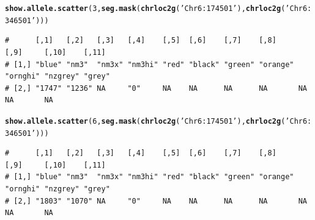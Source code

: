 \documentclass{article}\usepackage[]{graphicx}\usepackage[]{color}
\makeatletter
\newcommand{\hlnum}[1]{\textcolor[rgb]{0.686,0.059,0.569}{#1}}%
\newcommand{\hlstr}[1]{\textcolor[rgb]{0.192,0.494,0.8}{#1}}%
\newcommand{\hlstd}[1]{\textcolor[rgb]{0.345,0.345,0.345}{#1}}%
\newcommand{\hlkwd}[1]{\textcolor[rgb]{0.737,0.353,0.396}{\textbf{#1}}}%
\newenvironment{kframe}{%
 \def\at@end@of@kframe{}%
 \ifinner\ifhmode%
  \def\at@end@of@kframe{\end{minipage}}%
  \begin{minipage}{\columnwidth}%
 \fi\fi%
 \def\FrameCommand##1{\hskip\@totalleftmargin \hskip-\fboxsep
 \colorbox{shadecolor}{##1}\hskip-\fboxsep
     \hskip-\linewidth \hskip-\@totalleftmargin \hskip\columnwidth}%
 \MakeFramed {\advance\hsize-\width
   \@totalleftmargin\z@ \linewidth\hsize
   \@setminipage}}%
 {\par\unskip\endMakeFramed%
 \at@end@of@kframe}
\newenvironment{knitrout}{}{} %
\makeatother
\begin{document}
\begin{knitrout}\footnotesize
{}\color{fgcolor}\begin{kframe}
\begin{alltt}
\hlkwd{show.allele.scatter}\hlstd{(}\hlnum{3}\hlstd{,}\hlkwd{seg.mask}\hlstd{(}\hlkwd{chrloc2g}\hlstd{(}\hlstr{'Chr6:174501'}\hlstd{),}\hlkwd{chrloc2g}\hlstd{(}\hlstr{'Chr6:346501'}\hlstd{)))}
\end{alltt}
\begin{verbatim}
#      [,1]   [,2]   [,3]   [,4]    [,5]  [,6]    [,7]    [,8]     [,9]     [,10]    [,11] 
# [1,] "blue" "nm3"  "nm3x" "nm3hi" "red" "black" "green" "orange" "ornghi" "nzgrey" "grey"
# [2,] "1747" "1236" NA     "0"     NA    NA      NA      NA       NA       NA       NA
\end{verbatim}
\begin{alltt}
\hlkwd{show.allele.scatter}\hlstd{(}\hlnum{6}\hlstd{,}\hlkwd{seg.mask}\hlstd{(}\hlkwd{chrloc2g}\hlstd{(}\hlstr{'Chr6:174501'}\hlstd{),}\hlkwd{chrloc2g}\hlstd{(}\hlstr{'Chr6:346501'}\hlstd{)))}
\end{alltt}
\begin{verbatim}
#      [,1]   [,2]   [,3]   [,4]    [,5]  [,6]    [,7]    [,8]     [,9]     [,10]    [,11] 
# [1,] "blue" "nm3"  "nm3x" "nm3hi" "red" "black" "green" "orange" "ornghi" "nzgrey" "grey"
# [2,] "1803" "1070" NA     "0"     NA    NA      NA      NA       NA       NA       NA
\end{verbatim}
\end{kframe}


\end{knitrout}
\end{document}
